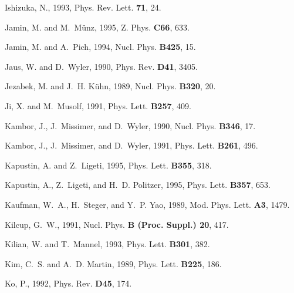 \begin{thebibliography}{\protect{}1991}
Ishizuka, N., 1993,
\newblock Phys. Rev. Lett. {\bf 71}, 24.

Jamin, M. and M.~M{\"u}nz, 1995,
\newblock Z. Phys. {\bf C66}, 633.

Jamin, M. and A.~Pich, 1994,
\newblock Nucl. Phys. {\bf B425}, 15.

Jaus, W. and D.~Wyler, 1990,
\newblock Phys. Rev. {\bf D41}, 3405.

Jezabek, M. and J.~H. K{\"u}hn, 1989,
\newblock Nucl. Phys. {\bf B320}, 20.

Ji, X. and M.~Musolf, 1991,
\newblock Phys. Lett. {\bf B257}, 409.

Kambor, J., J.~Missimer, and D.~Wyler, 1990,
\newblock Nucl. Phys. {\bf B346}, 17.

Kambor, J., J.~Missimer, and D.~Wyler, 1991,
\newblock Phys. Lett. {\bf B261}, 496.

Kapustin, A. and Z.~Ligeti, 1995,
\newblock Phys. Lett. {\bf B355}, 318.

Kapustin, A., Z.~Ligeti, and H.~D. Politzer, 1995,
\newblock Phys. Lett. {\bf B357}, 653.

Kaufman, W.~A., H.~Steger, and Y.~P. Yao, 1989,
\newblock Mod. Phys. Lett. {\bf A3}, 1479.

Kilcup, G.~W., 1991,
\newblock Nucl. Phys. {\bf B (Proc. Suppl.) 20}, 417.

Kilian, W. and T.~Mannel, 1993,
\newblock Phys. Lett. {\bf B301}, 382.

Kim, C.~S. and A.~D. Martin, 1989,
\newblock Phys. Lett. {\bf B225}, 186.

Ko, P., 1992,
\newblock Phys. Rev. {\bf D45}, 174.


\end{thebibliography}
